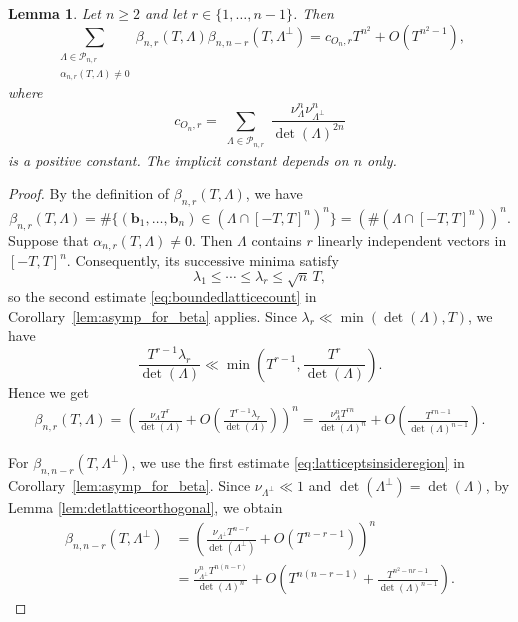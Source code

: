 \documentclass[11pt,reqno]{amsart}
\newtheorem{lem}[thm]{Lemma}
\theoremstyle{definition}
\theoremstyle{remark}
\numberwithin{equation}{section}
\numberwithin{thm}{section}
\numberwithin{table}{section}
\def\b{\mathbf{b}}
\begin{document}
\begin{lem}\label{lem:beta_beta_sum_asymp}
    Let $n \ge 2$ and let $r \in \{1,\ldots,n-1\}$. Then
    \[
    \sum_{\substack{\Lambda\in\mathcal{P}_{n,r}\\
    \alpha_{n,r}(T,\Lambda)\neq0}}
    \beta_{n,r}(T,\Lambda)
    \beta_{n,n-r}(T,\Lambda^{\perp})
    =
    c_{O_n,r}T^{n^2}+O(T^{n^2-1}),
    \]
    where
    \[
    c_{O_n,r}
    =
    \sum_{\substack{\Lambda\in\mathcal{P}_{n,r}}}
    \frac{\nu_{\Lambda}^n\nu_{\Lambda^\perp}^n}
    {\det(\Lambda)^{2n}}
    \]
    is a positive constant. The implicit constant depends on $n$ only.
\end{lem}

\begin{proof}
By the definition of $\beta_{n,r}(T,\Lambda)$, we have
\begin{equation*}
    \beta_{n,r}(T,\Lambda)
    =
    \#\{(\b_1,\ldots,\b_n)\in(\Lambda\cap[-T,T]^n)^n\}
    =
    \left(\#(\Lambda\cap[-T,T]^{n})\right)^n.
\end{equation*}
Suppose that $\alpha_{n,r}(T,\Lambda)\neq0$. Then $\Lambda$ contains
$r$ linearly independent vectors in $[-T,T]^n$. Consequently, its
successive minima satisfy
\[
\lambda_1\leq\cdots\leq\lambda_r\leq\sqrt n\,T,
\]
so the second estimate \eqref{eq:boundedlatticecount} in Corollary~\ref{lem:asymp_for_beta} applies.
Since $\lambda_r \ll \min (\det(\Lambda),T)$, we have 
\[
    \frac{T^{r-1}\lambda_r}{\det(\Lambda)} \ll \min \left( T^{r-1}, \frac{T^r}{\det(\Lambda)}
    \right) .
\]
Hence we get 
\begin{align*}
 \beta_{n,r}(T,\Lambda)
 =
 \left(
 \frac{\nu_{\Lambda}T^r}{\det(\Lambda)}
 +
 O\left(
 \frac{T^{r-1}\lambda_r}{\det(\Lambda)}
 \right)
 \right)^n
 =
 \frac{\nu_{\Lambda}^nT^{rn}}{\det(\Lambda)^n}
 +
 O\left(
 \frac{T^{rn-1}}{\det(\Lambda)^{n-1}}
 \right).
\end{align*}

For $\beta_{n,n-r}(T,\Lambda^\perp)$, we use the first estimate \eqref{eq:latticeptsinsideregion} in
Corollary~\ref{lem:asymp_for_beta}. Since
$\nu_{\Lambda^\perp}\ll 1$ and 
$\det(\Lambda^\perp)=\det(\Lambda)$,
by Lemma \ref{lem:detlatticeorthogonal},
we obtain
\begin{align*}
 \beta_{n,n-r}(T,\Lambda^\perp)
 &=
 \left(
 \frac{\nu_{\Lambda^\perp}T^{n-r}}{\det(\Lambda^\perp)}
 +O(T^{n-r-1})
 \right)^n\\
 &=
 \frac{\nu_{\Lambda^\perp}^nT^{n(n-r)}}{\det(\Lambda)^n}
 +
 O\left(
 T^{n(n-r-1)} + \frac{T^{n^2-nr-1}}{\det(\Lambda)^{n-1}}
 \right).
\end{align*}


\end{proof}
\end{document}
